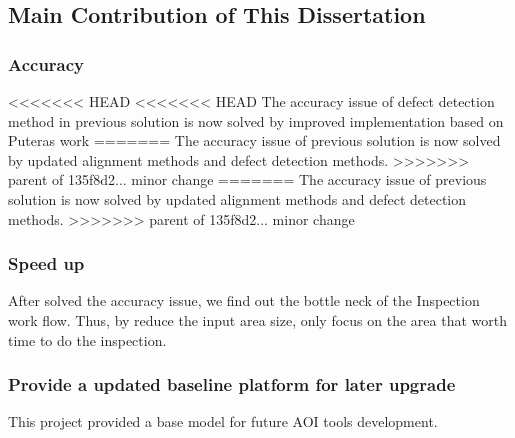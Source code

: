 	\subsection{Main Contribution of This Dissertation}
	\label{subsec:advantages}
		\subsubsection{Accuracy}
<<<<<<< HEAD
<<<<<<< HEAD
			The accuracy issue of defect detection method in previous solution is now solved by improved implementation based on Puteras work 
=======
			The accuracy issue of previous solution is now solved by updated alignment methods and defect detection methods.
>>>>>>> parent of 135f8d2... minor change
=======
			The accuracy issue of previous solution is now solved by updated alignment methods and defect detection methods.
>>>>>>> parent of 135f8d2... minor change

		\subsubsection{Speed up}
			After solved the accuracy issue, we find out the bottle neck of the Inspection work flow. Thus, by reduce the input area size, only focus on the area that worth time to do the inspection.

		\subsubsection{Provide a updated baseline platform for later upgrade}
			This project provided a base model for future AOI tools development.
